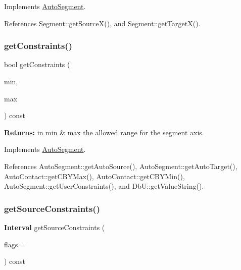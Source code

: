 Implements \hyperlink{classKatabatic_1_1AutoSegment_a248eb2fbb06e3286650b28567d495f0b}{Auto\+Segment}.



References Segment\+::get\+Source\+X(), and Segment\+::get\+Target\+X().

\mbox{\label{classKatabatic_1_1AutoHorizontal_a16737e7f2b77f8595fd2b607fac0f2f5}} 
\subsubsection{\texorpdfstring{get\+Constraints()}{getConstraints()}}
{\footnotesize\ttfamily bool get\+Constraints (\begin{DoxyParamCaption}\item[{\textbf{ Db\+U\+::\+Unit} \&}]{min,  }\item[{\textbf{ Db\+U\+::\+Unit} \&}]{max }\end{DoxyParamCaption}) const\hspace{0.3cm}{\ttfamily [virtual]}}

{\bfseries Returns\+:} in {\ttfamily min} \& {\ttfamily max} the allowed range for the segment axis. 

Implements \hyperlink{classKatabatic_1_1AutoSegment_a7c2fed22b081f8d3b7a69abb457153ea}{Auto\+Segment}.



References Auto\+Segment\+::get\+Auto\+Source(), Auto\+Segment\+::get\+Auto\+Target(), Auto\+Contact\+::get\+C\+B\+Y\+Max(), Auto\+Contact\+::get\+C\+B\+Y\+Min(), Auto\+Segment\+::get\+User\+Constraints(), and Db\+U\+::get\+Value\+String().

\mbox{\label{classKatabatic_1_1AutoHorizontal_a3239751f475bc65adb9d56f6c771ebb0}} 
\subsubsection{\texorpdfstring{get\+Source\+Constraints()}{getSourceConstraints()}}
{\footnotesize\ttfamily \textbf{ Interval} get\+Source\+Constraints (\begin{DoxyParamCaption}\item[{unsigned int}]{flags = {} }\end{DoxyParamCaption}) const\hspace{0.3cm}{\ttfamily [virtual]}}

